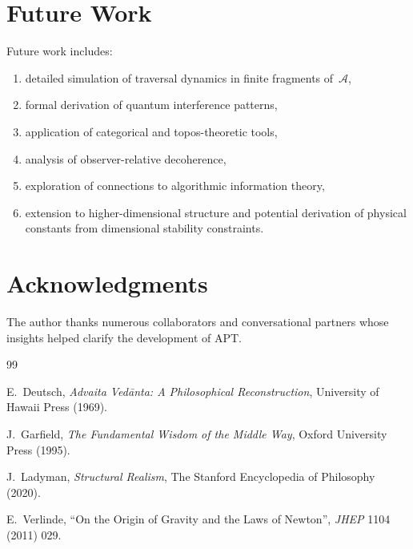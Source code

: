 \documentclass[12pt]{article}
\begin{document}
\section{Future Work}

Future work includes:
\begin{enumerate}
    \item detailed simulation of traversal dynamics in finite fragments 
    of~$\mathcal{A}$,
    \item formal derivation of quantum interference patterns,
    \item application of categorical and topos-theoretic tools,
    \item analysis of observer-relative decoherence,
    \item exploration of connections to algorithmic information theory,
    \item extension to higher-dimensional structure and potential derivation
          of physical constants from dimensional stability constraints.
\end{enumerate}

\section*{Acknowledgments}

The author thanks numerous collaborators and conversational partners
whose insights helped clarify the development of APT.

\begin{thebibliography}{99}

E.~Deutsch,
\textit{Advaita Vedānta: A Philosophical Reconstruction},
University of Hawaii Press (1969).

J.~Garfield,
\textit{The Fundamental Wisdom of the Middle Way},
Oxford University Press (1995).

J.~Ladyman,
\textit{Structural Realism},
The Stanford Encyclopedia of Philosophy (2020).

E.~Verlinde,
``On the Origin of Gravity and the Laws of Newton'',
\textit{JHEP} 1104 (2011) 029.

\end{thebibliography}
\end{document}
